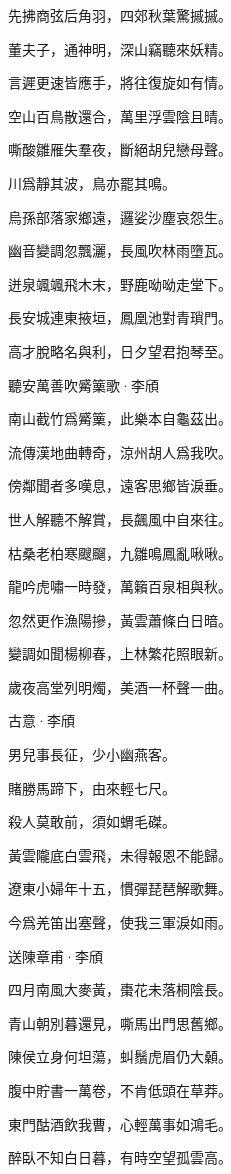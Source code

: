 \documentclass[12pt,a4paper]{ctexbook}
\begin{document}
先拂商弦后角羽，四郊秋葉驚摵摵。\par
董夫子，通神明，深山竊聽來妖精。\par
言遲更速皆應手，將往復旋如有情。\par
空山百鳥散還合，萬里浮雲陰且晴。\par
嘶酸雛雁失羣夜，斷絕胡兒戀母聲。\par
川爲靜其波，鳥亦罷其鳴。\par
烏孫部落家鄉遠，邏娑沙塵哀怨生。\par
幽音變調忽飄灑，長風吹林雨墮瓦。\par
迸泉颯颯飛木末，野鹿呦呦走堂下。\par
長安城連東掖垣，鳳凰池對青瑣門。\par
高才脫略名與利，日夕望君抱琴至。\par
聽安萬善吹觱篥歌·李頎\par
南山截竹爲觱篥，此樂本自龜茲出。\par
流傳漢地曲轉奇，涼州胡人爲我吹。\par
傍鄰聞者多嘆息，遠客思鄉皆淚垂。\par
世人解聽不解賞，長飆風中自來往。\par
枯桑老柏寒颼飀，九雛鳴鳳亂啾啾。\par
龍吟虎嘯一時發，萬籟百泉相與秋。\par
忽然更作漁陽摻，黃雲蕭條白日暗。\par
變調如聞楊柳春，上林繁花照眼新。\par
歲夜高堂列明燭，美酒一杯聲一曲。\par
古意·李頎\par
男兒事長征，少小幽燕客。\par
賭勝馬蹄下，由來輕七尺。\par
殺人莫敢前，須如蝟毛磔。\par
黃雲隴底白雲飛，未得報恩不能歸。\par
遼東小婦年十五，慣彈琵琶解歌舞。\par
今爲羌笛出塞聲，使我三軍淚如雨。\par
送陳章甫·李頎\par
四月南風大麥黃，棗花未落桐陰長。\par
青山朝別暮還見，嘶馬出門思舊鄉。\par
陳侯立身何坦蕩，虯鬚虎眉仍大顙。\par
腹中貯書一萬卷，不肯低頭在草莽。\par
東門酤酒飲我曹，心輕萬事如鴻毛。\par
醉臥不知白日暮，有時空望孤雲高。\par
\end{document}
